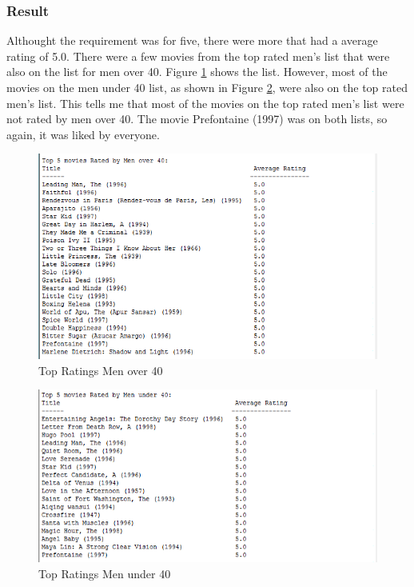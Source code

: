 \documentclass[paper=a4, fontsize=11pt]{scrartcl} %
\numberwithin{equation}{section} %
\numberwithin{figure}{section} %
\numberwithin{table}{section} %
\begin{document}


\subsubsection{Result}
Althought the requirement was for five, there were more that had a average rating of 5.0.
There were a few movies from the top rated men's list that were also on the list for men over 40.
Figure \ref{fig:mO40} shows the list.
However, most of the movies on the men under 40 list, as shown in Figure \ref{fig:mU40}, were also on the top rated men's list.
This tells me that most of the movies on the top rated men's list were not rated by men over 40.
The movie Prefontaine (1997) was on both lists, so again, it was liked by everyone.

\begin{figure}[H]
\includegraphics[width=1\textwidth]{pics/topMenO40}
\caption{Top Ratings Men over 40}
\label{fig:mO40}
\end{figure}

\begin{figure}[H]
\includegraphics[width=1\textwidth]{pics/topMenU40}
\caption{Top Ratings Men under 40}
\label{fig:mU40}
\end{figure}
\end{document}
